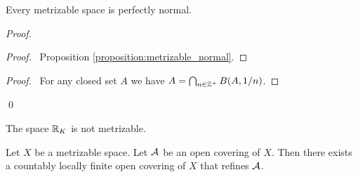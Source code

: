 \begin{proposition}
    Every metrizable space is perfectly normal.
\end{proposition}

\begin{proof}
    \pf
    \begin{proof}
        \pf\ Proposition \ref{proposition:metrizable_normal}.
    \end{proof}
    \begin{proof}
        \pf\ For any closed set $A$ we have $A = \bigcap_{n \in \ZZ^+}
        B(A,1/n)$.
    \end{proof}
    \qed
\end{proof}

\begin{corollary}
    The space $\RR_K$ is not metrizable.
\end{corollary}

\begin{proposition}[Choice]
    Let $X$ be a metrizable space. Let $\AA$ be an open covering of $X$.
    Then there exists a countably locally finite open covering of $X$ that refines $\AA$.
\end{proposition}

